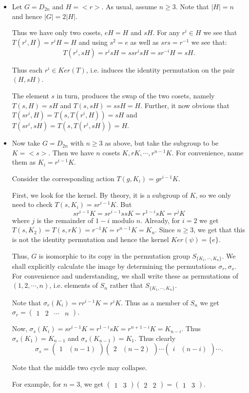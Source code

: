 \documentclass[12pt]{article}
\newcommand{\matr}[2]{\left( \begin{array}{*{#1}{r}}#2\end{array}\right)}
\begin{document}
\begin{enumerate}
\begin{itemize}
\item Let $G=D_{2n}$ and $H=<r>$. As usual, assume $n\geq 3$. 
Note that $|H|=n$ and hence $|G|=2|H|$.

Thus we have only two cosets, $eH = H$ and $sH$. For any $r^i\in H$ we
see that $T(r^i,H) = r^iH = H$ and using $s^2=e$ as well as $srs =
r^{-1}$ we see that: 
$$T(r^i,sH) = r^isH = ssr^isH = sr^{-i}H =  sH.$$

Thus each $r^i\in Ker(T)$, i.e. induces the identity permutation on
the pair $(H,sH)$.

The element $s$ in turn, produces the swap of the two cosets, namely
$T(s,H)=sH$ and $T(s,sH)=ssH = H$. Further, it now obvious that 
$T(sr^i,H) = T(s,T(r^i,H))= sH$ and $T(sr^i,sH) = T(s,T(r^i,sH))=H$.

\item Now take $G=D_{2n}$ with $n\geq 3$ as above, but take the subgroup to be $K=<s>$.
Then we have $n$ cosets $K,rK,\cdots,r^{n-1}K$. For convenience, name
them as $K_i = r^{i-1}K$.

Consider the corresponding action $T(g,K_i)=gr^{i-1}K$.

First, we look for the kernel. By theory, it is a subgroup of $K$, so we
only need to check $T(s,K_i)= sr^{i-1}K$. But 
$$sr^{i-1}K=sr^{i-1}ssK = r^{1-i}sK = r^jK$$
where $j$ is the remainder of $1-i$ modulo $n$.
Already, for $i=2$ we get $T(s,K_2) = T(s,rK) = r^{-1}K = r^{n-1}K =
K_n$. Since $n\geq 3$, we get that this is not the identity permutation
and hence the kernel $Ker(\psi)=\{e\}$.

Thus, $G$ is isomorphic to its copy in the permutation group
$S_{\{K_1,\cdots,K_n\}}$.
We shall explicitly calculate the image by determining the permutations
$\sigma_r,\sigma_s$. For convenience and understanding, we shall write
these as permutations of $(1,2,\cdots,n)$, i.e. elements of $S_n$ rather
that $S_{\{K_1,\cdots,K_n\}}$.

Note that $\sigma_r(K_i)=rr^{i-1}K = r^iK$. Thus as a member of $S_n$ we
get $\sigma_r = \matr{4}{1 & 2 & \cdots & n}$.

Now, $\sigma_s(K_i) = sr^{i-1}K =r^{1-i}sK = r^{n+1-i}K=K_{n-i}$.
Thus $\sigma_s(K_1) = K_{n-1}$ and $\sigma_s(K_{n-1})=K_1$. 
Thus clearly 
$$\sigma_s = \matr{2}{1 & (n-1)} \matr{2}{2 & (n-2)} \cdots \matr{2}{i & (n-i)}
\cdots .$$

Note that the middle two cycle may collapse.

For example, for $n=3$, we get $\matr{2}{1 & 3}\matr{2}{2 & 2}
= \matr{2}{1 & 3}$.


\end{itemize}
\end{enumerate}
\end{document}
